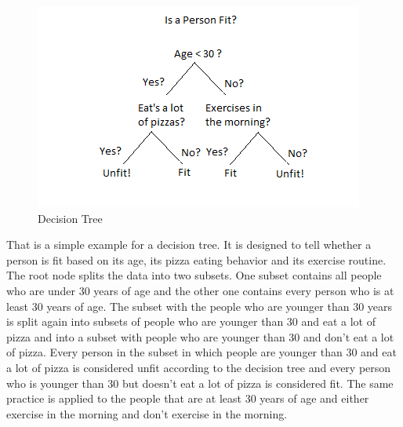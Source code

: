 \documentclass[a4paper,12pt]{report}
\begin{document}
\begin{figure}[htbp]
  \centering
  \includegraphics[width=\textwidth]{images/Decision-Trees.png}
  \caption{Decision Tree}
  \label{fig:fullwidth}
\end{figure}
	
	That is a simple example for a decision tree. It is designed to tell whether a person is fit based on its age, its pizza eating behavior and its exercise routine. The root node splits the data into two subsets. One subset contains all people who are under 30 years of age and the other one contains every person who is at least 30 years of age. The subset with the people who are younger than 30 years is split again into subsets of people who are younger than 30 and eat a lot of pizza and into a subset with people who are younger than 30 and don’t eat a lot of pizza. Every person in the subset in which people are younger than 30 and eat a lot of pizza is considered unfit according to the decision tree and every person who is younger than 30 but doesn’t eat a lot of pizza is considered fit. The same practice is applied to the people that are at least 30 years of age and either exercise in the morning and don’t exercise in the morning.\\\\
	
\end{document}
